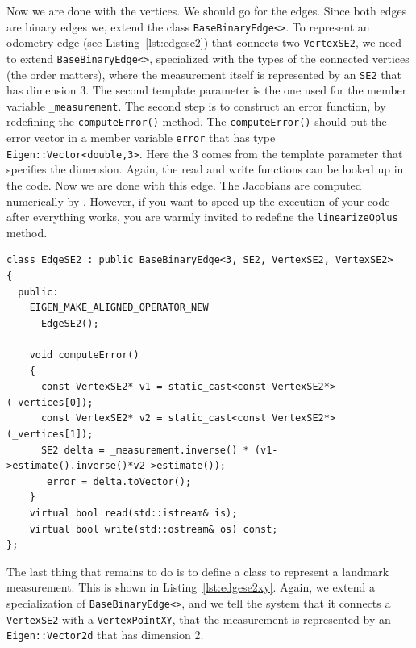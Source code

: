 \documentclass[a4paper]{article}
\begin{document}
Now we are done with the vertices. We should go for the edges.  Since
both edges are binary edges we, extend the class
\verb+BaseBinaryEdge<>+.
To represent an odometry edge (see Listing~\ref{lst:edgese2}) that
connects two \verb+VertexSE2+, we need to extend
\verb+BaseBinaryEdge<>+,  specialized with the types of the
connected vertices (the order matters), where the measurement itself
is represented by an \verb+SE2+ that has dimension 3. The second
template parameter is the one used for the member variable
\verb+_measurement+.  The second step is to construct an error
function, by redefining the \verb+computeError()+ method.  The
\verb+computeError()+ should put the error vector in a member variable
\verb+error+ that has type \verb+Eigen::Vector<double,3>+. Here the 3
comes from the template parameter that specifies the dimension.
Again, the read and write functions can be looked up in the code.
Now we are done with this edge. The Jacobians are computed numerically
by \gopt{}.  However, if you want to speed up the execution of your
code after everything works, you are warmly invited to redefine the
\verb+linearizeOplus+ method.

\begin{lstlisting}[float,label=lst:edgese2,caption=\text{Edge connecting two
  robot poses, for example, the odometry of the robot.}]
class EdgeSE2 : public BaseBinaryEdge<3, SE2, VertexSE2, VertexSE2>
{
  public:
    EIGEN_MAKE_ALIGNED_OPERATOR_NEW
      EdgeSE2();

    void computeError()
    {
      const VertexSE2* v1 = static_cast<const VertexSE2*>(_vertices[0]);
      const VertexSE2* v2 = static_cast<const VertexSE2*>(_vertices[1]);
      SE2 delta = _measurement.inverse() * (v1->estimate().inverse()*v2->estimate());
      _error = delta.toVector();
    }
    virtual bool read(std::istream& is);
    virtual bool write(std::ostream& os) const;
};
\end{lstlisting}

The last thing that remains to do is to define a class to represent a
landmark measurement.  This is shown in Listing~\ref{lst:edgese2xy}.
Again, we extend a specialization of \verb+BaseBinaryEdge<>+, and we
tell the system that it connects a \verb+VertexSE2+ with a
\verb+VertexPointXY+, that the measurement is represented by an
\verb+Eigen::Vector2d+ that has dimension 2.
\end{document}
